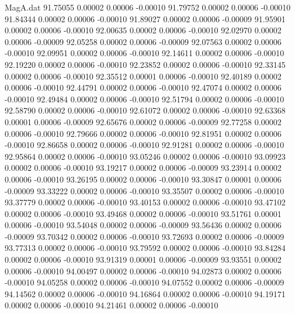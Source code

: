 \begin{filecontents}{MagA.dat}
  91.75055    0.00002    0.00006   -0.00010
  91.79752    0.00002    0.00006   -0.00010
  91.84344    0.00002    0.00006   -0.00010
  91.89027    0.00002    0.00006   -0.00009
  91.95901    0.00002    0.00006   -0.00010
  92.00635    0.00002    0.00006   -0.00010
  92.02970    0.00002    0.00006   -0.00009
  92.05258    0.00002    0.00006   -0.00009
  92.07563    0.00002    0.00006   -0.00010
  92.09951    0.00002    0.00006   -0.00010
  92.14611    0.00002    0.00006   -0.00010
  92.19220    0.00002    0.00006   -0.00010
  92.23852    0.00002    0.00006   -0.00010
  92.33145    0.00002    0.00006   -0.00010
  92.35512    0.00001    0.00006   -0.00010
  92.40189    0.00002    0.00006   -0.00010
  92.44791    0.00002    0.00006   -0.00010
  92.47074    0.00002    0.00006   -0.00010
  92.49484    0.00002    0.00006   -0.00010
  92.51794    0.00002    0.00006   -0.00010
  92.58790    0.00002    0.00006   -0.00010
  92.61072    0.00002    0.00006   -0.00010
  92.63368    0.00001    0.00006   -0.00009
  92.65676    0.00002    0.00006   -0.00009
  92.77258    0.00002    0.00006   -0.00010
  92.79666    0.00002    0.00006   -0.00010
  92.81951    0.00002    0.00006   -0.00010
  92.86658    0.00002    0.00006   -0.00010
  92.91281    0.00002    0.00006   -0.00010
  92.95864    0.00002    0.00006   -0.00010
  93.05246    0.00002    0.00006   -0.00010
  93.09923    0.00002    0.00006   -0.00010
  93.19217    0.00002    0.00006   -0.00009
  93.23914    0.00002    0.00006   -0.00010
  93.26195    0.00002    0.00006   -0.00010
  93.30847    0.00001    0.00006   -0.00009
  93.33222    0.00002    0.00006   -0.00010
  93.35507    0.00002    0.00006   -0.00010
  93.37779    0.00002    0.00006   -0.00010
  93.40153    0.00002    0.00006   -0.00010
  93.47102    0.00002    0.00006   -0.00010
  93.49468    0.00002    0.00006   -0.00010
  93.51761    0.00001    0.00006   -0.00010
  93.54048    0.00002    0.00006   -0.00009
  93.56436    0.00002    0.00006   -0.00009
  93.70342    0.00002    0.00006   -0.00010
  93.72693    0.00002    0.00006   -0.00009
  93.77313    0.00002    0.00006   -0.00010
  93.79592    0.00002    0.00006   -0.00010
  93.84284    0.00002    0.00006   -0.00010
  93.91319    0.00001    0.00006   -0.00009
  93.93551    0.00002    0.00006   -0.00010
  94.00497    0.00002    0.00006   -0.00010
  94.02873    0.00002    0.00006   -0.00010
  94.05258    0.00002    0.00006   -0.00010
  94.07552    0.00002    0.00006   -0.00009
  94.14562    0.00002    0.00006   -0.00010
  94.16864    0.00002    0.00006   -0.00010
  94.19171    0.00002    0.00006   -0.00010
  94.21461    0.00002    0.00006   -0.00010

\end{filecontents}
